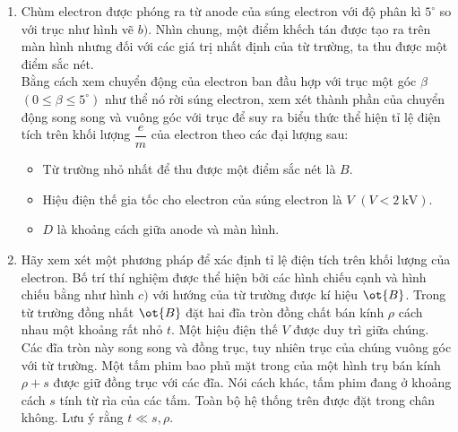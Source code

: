 \begin{vd}
\begin{center}
\end{center}
\begin{enumerate}[1)]
    \item 
Chùm electron được phóng ra từ anode của súng electron với độ phân kì $5^\circ$ so với trục như hình vẽ $b)$. Nhìn chung, một điểm khếch tán được tạo ra trên màn hình nhưng đối với các giá trị nhất định của từ trường, ta thu được một điểm sắc nét. \\
Bằng cách xem chuyển động của electron ban đầu hợp với trục một góc $\beta$ $(0 \le \beta \le 5^\circ)$ như thể nó rời súng electron, xem xét thành phần của chuyển động song song và vuông góc với trục để suy ra biểu thức thể hiện tỉ lệ điện tích trên khối lượng $\dfrac{e}{m}$ của electron theo các đại lượng sau:
\begin{itemize}
    \item Từ trường nhỏ nhất để thu được  một điểm sắc nét là $B$.
    \item Hiệu điện thế gia tốc cho electron của súng electron là $V$ $(V < 2 ~\mathrm{kV})$.
    \item $D$ là khoảng cách giữa anode và màn hình. 
\end{itemize}
\item Hãy xem xét một phương pháp để xác định tỉ lệ điện tích trên khối lượng của electron.  Bố trí thí nghiệm được thể hiện bởi các hình chiếu cạnh và hình chiếu bằng như hình $c)$ với hướng của từ trường được kí hiệu $\ot{B}$. Trong từ trường đồng nhất $\ot{B}$ đặt hai đĩa tròn đồng chất bán kính $\rho$ cách nhau một khoảng rất nhỏ $t$. Một hiệu điện thế $V$ được duy trì giữa chúng. Các đĩa tròn này song song và đồng trục, tuy nhiên trục của chúng vuông góc với từ trường. Một tấm phim bao phủ mặt trong của một hình trụ bán kính $\rho + s$ được giữ đồng trục với các đĩa. Nói cách khác, tấm phim đang ở khoảng cách $s$ tính từ rìa của các tấm. Toàn bộ hệ thống trên được đặt trong chân không. Lưu ý rằng $t \ll s, \rho$.\\

\end{enumerate}
\end{vd}
